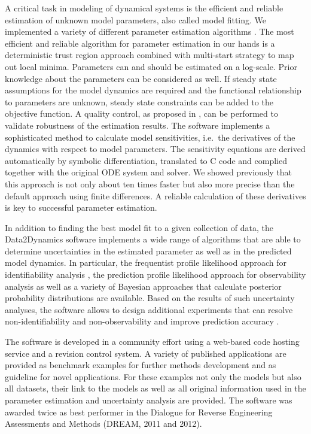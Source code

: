 \documentclass{bioinfo}
\begin{document}
A critical task in modeling of dynamical systems is the efficient and reliable estimation of 
unknown model parameters, also called model fitting. 
We implemented a variety of different 
parameter estimation algorithms \citep{Raue:2012zt}. The most efficient and reliable 
algorithm for parameter estimation in our hands is a deterministic trust region approach 
combined with multi-start strategy to map out local minima. Parameters can and should 
be estimated on a log-scale. Prior knowledge about the parameters can be considered as 
well. If steady state assumptions for the model dynamics are required and the functional 
relationship to parameters are unknown, steady state constraints can be added to the 
objective function. A quality control, as proposed in 
\citet{Raue:2012zt}, can be performed to validate robustness of the estimation results. The 
software implements a sophisticated method to calculate model sensitivities, i.e.~the 
derivatives of the dynamics with respect to model parameters. The sensitivity equations 
are derived automatically by symbolic differentiation, translated to C code and complied 
together with the original ODE system and solver. We showed previously 
\citep{Raue:2012zt} that this approach is not only about ten times faster but also more 
precise than the default approach using finite differences. A reliable calculation of these 
derivatives is key to successful parameter estimation. 

In addition to finding the best model fit to a given collection of data, the Data2Dynamics 
software implements a wide range of algorithms that are able to determine uncertainties 
in the estimated parameter as well as in the predicted model dynamics. In particular, the 
frequentist profile likelihood approach for identifiability analysis \citep{Raue:2009ec}, the 
prediction profile likelihood approach for observability analysis \citep{Kreutz:2011kx} as 
well as a variety of Bayesian approaches \citep{Raue:2013fk, Hug:2012fk} that calculate 
posterior probability distributions are available. Based on the results of such uncertainty 
analyses, the software allows to design additional experiments \citep{Steiert:2012fk} that 
can resolve non-identifiability and non-observability \citep{Raue:2010fk} 
and improve prediction accuracy \citep{Kreutz:2013uq}.

The software is developed in a community effort using a web-based 
code hosting service 
and a revision control system. A variety of published applications are provided as benchmark examples for further methods development and as guideline for novel applications. For these examples not only the models but also all datasets, their link to the models as well as all original information used in the parameter estimation and uncertainty analysis are provided. The software was awarded twice as best performer in the Dialogue for Reverse Engineering Assessments and Methods (DREAM, 2011 and 2012).
\end{document}
